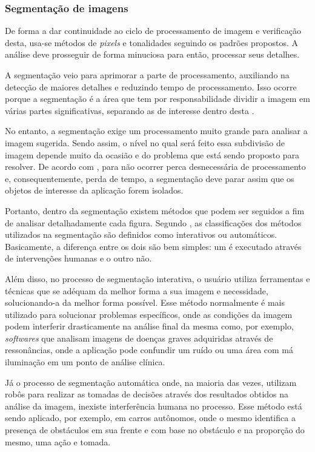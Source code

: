 \subsubsection{{Segmentação de imagens}}

De forma a dar continuidade ao ciclo de processamento de imagem e verificação desta, usa-se métodos de \textit{pixels} e tonalidades seguindo os padrões propostos. A análise deve prosseguir de forma minuciosa para então, processar seus detalhes.

A segmentação veio para aprimorar a parte de processamento, auxiliando na detecção de maiores detalhes e reduzindo tempo de processamento. Isso ocorre porque a segmentação é a área que tem por responsabilidade dividir a imagem em várias partes significativas, separando as de interesse dentro desta \cite{FILHO1999}.

No entanto, a segmentação exige um processamento muito grande para analisar a imagem sugerida. Sendo assim, o nível no qual será feito essa subdivisão de imagem depende muito da ocasião e do problema que está sendo proposto para resolver. De acordo com , para não ocorrer perca desnecessária de processamento e, consequentemente, perda de tempo, a segmentação deve parar assim que os objetos de interesse da aplicação forem isolados.

Portanto, dentro da segmentação existem métodos que podem ser seguidos a fim de analisar detalhadamente cada figura. Segundo , as classificações dos métodos utilizados na segmentação são definidos como interativos ou automáticos. Basicamente, a diferença entre os dois são bem simples: um é executado através de intervenções humanas e o outro não.

Além disso, no processo de segmentação interativa, o usuário utiliza ferramentas e técnicas que se adéquam da melhor forma a sua imagem e necessidade, solucionando-a da melhor forma possível. Esse método normalmente é mais utilizado para solucionar problemas específicos, onde as condições da imagem podem interferir drasticamente na análise final da mesma como, por exemplo, \textit{softwares} que analisam imagens de doenças graves adquiridas através de ressonâncias, onde a aplicação pode confundir um ruído ou uma área com má iluminação em um ponto de análise clínica.

Já o processo de segmentação automática onde, na maioria das vezes, utilizam robôs para realizar as tomadas de decisões através dos resultados obtidos na análise da imagem, inexiste interferência humana no processo. Esse método está sendo aplicado, por exemplo, em carros autônomos, onde o mesmo identifica a presença de obstáculos em sua frente e com base no obstáculo e na proporção do mesmo, uma ação e tomada.

